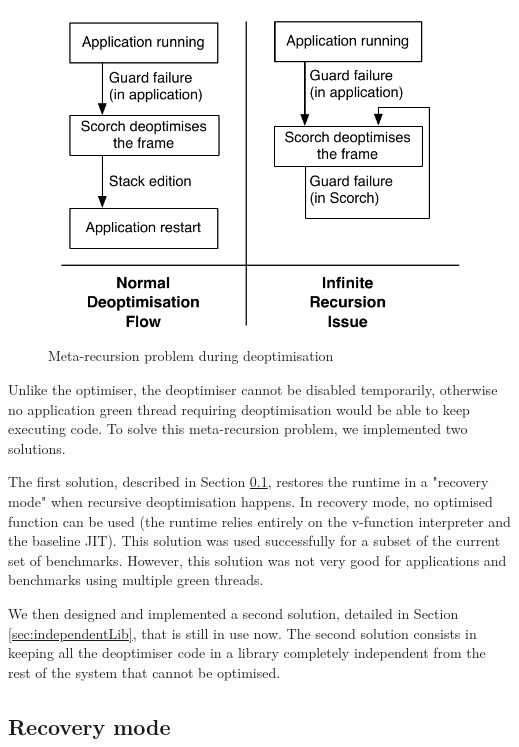 \documentclass[a4paper,12pt,twoside]{../includes/ThesisStyle}
\begin{document}
\begin{figure}[h!]
    \begin{center}
        \includegraphics[width=0.65\linewidth]{InfiniteRecursionDeoptPb}
        \caption{Meta-recursion problem during deoptimisation}
        \label{fig:InfiniteRecursionDeoptPb}
    \end{center}
\end{figure}

Unlike the optimiser, the deoptimiser cannot be disabled temporarily, otherwise no application green thread requiring deoptimisation would be able to keep executing code. To solve this meta-recursion problem, we implemented two solutions. 

The first solution, described in Section \ref{sec:recovery}, restores the runtime in a "recovery mode" when recursive deoptimisation happens. In recovery mode, no optimised function can be used (the runtime relies entirely on the v-function interpreter and the baseline JIT). This solution was used successfully for a subset of the current set of benchmarks. However, this solution was not very good for applications and benchmarks using multiple green threads. 

We then designed and implemented a second solution, detailed in Section \ref{sec:independentLib}, that is still in use now. The second solution consists in keeping all the deoptimiser code in a library completely independent from the rest of the system that cannot be optimised.

\subsection{Recovery mode}
\label{sec:recovery}
\end{document}
